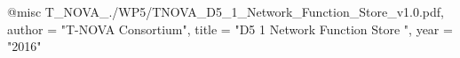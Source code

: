 @misc{ T_NOVA_./WP5/TNOVA_D5_1_Network_Function_Store_v1.0.pdf,
       author = "T-NOVA Consortium",
       title = "D5 1 Network Function Store ",
       year = "2016" }
